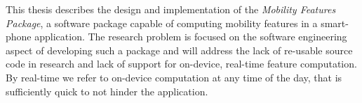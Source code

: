 This thesis describes the design and implementation of the \textit{Mobility Features Package}, a software package capable of computing mobility features in a smart-phone application. The research problem is focused on the software engineering aspect of developing such a package and will address the lack of re-usable source code in research and lack of support for on-device, real-time feature computation. By real-time we refer to on-device computation at any time of the day, that is sufficiently quick to not hinder the application.